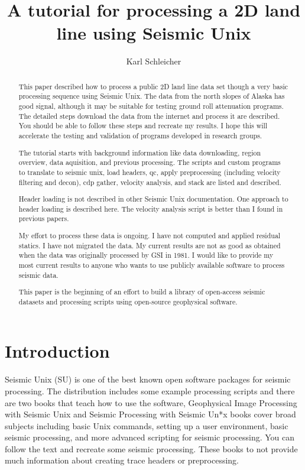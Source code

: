 \title{A tutorial for processing a 2D land line using Seismic Unix}                                           %
\author{Karl Schleicher}

\maketitle

\begin{abstract}
This paper described how to process a public 2D land line data set
though a very basic processing sequence using Seismic Unix. The data
from the north slopes of Alaska has good signal, although it may be
suitable for testing ground roll attenuation programs.  The detailed
steps download the data from the internet and process it are
described.  You should be able to follow these steps and recreate my
results.  I hope this will accelerate the testing and validation of
programs developed in research groups.
\par
The tutorial starts with background information like data downloading,
region overview, data aquisition, and previous processing.  The
scripts and custom programs to translate to seismic unix, load
headers, qc, apply preprocessing (including velocity filtering and
decon), cdp gather, velocity analysis, and stack are listed and
described.

Header loading is not described in other Seismic Unix documentation.
One approach to header loading is described here.  The velocity
analysis script is better than I found in previous papers.

My effort to process these data is ongoing.  I have not computed and
applied residual statics.  I have not migrated the data.  My current
results are not as good as obtained when the data was originally
processed by GSI in 1981.  I would like to provide my most current
results to anyone who wants to use publicly available software to
process seismic data.

This paper is the beginning of an effort to build a library of
open-access seismic datasets and processing scripts using open-source
geophysical software.
\end{abstract}

\section{Introduction}
Seismic Unix (SU) is one of the best known open software packages for
seismic processing.  The distribution includes some example processing
scripts and there are two books that teach how to use the software,
Geophysical Image Processing with Seismic Unix \cite[]{stockwell} and
Seismic Processing with Seismic Un*x \cite[]{forel} books cover broad
subjects including basic Unix commands, setting up a user environment,
basic seismic processing, and more advanced scripting for seismic
processing.  You can follow the text and recreate some seismic
processing.  These books to not provide much information about
creating trace headers or preprocessing.\nocite{cohen}

